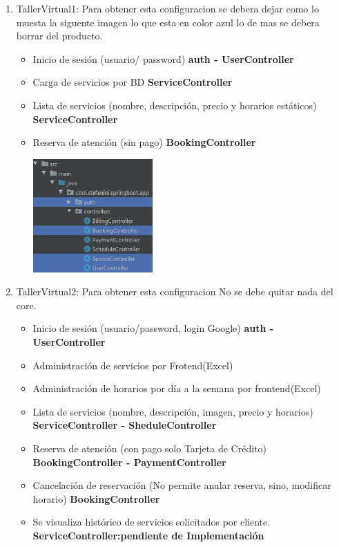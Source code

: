 \documentclass[10pt,a4paper,openany]{book}
\begin{document}
\begin{enumerate}
	\item TallerVirtual1: Para obtener esta configuracion se debera dejar como lo muesta la siguente imagen lo que esta en color azul lo de mas se debera borrar del producto.
	\begin{itemize}
		\item Inicio de sesión (usuario/ password) \textbf{auth - UserController}
		\item Carga de servicios por BD \textbf{ServiceController}
		\item Lista de servicios (nombre, descripción, precio y horarios estáticos) \textbf{ServiceController}
		\item Reserva de atención (sin pago) \textbf{BookingController}
		\begin{center}
		\includegraphics[width=0.38\textwidth]{div1}
		\end{center}
	\end{itemize}
	\item TallerVirtual2: Para obtener esta configuracion No se debe quitar nada del core.
	\begin{itemize}
		\item Inicio de sesión (usuario/password, login Google) \textbf{auth - UserController}
		\item Administración de servicios por Frotend(Excel)
		\item Administración de horarios por día a la semana por frontend(Excel)
		\item Lista de servicios (nombre, descripción, imagen, precio y horarios) \textbf{ServiceController - SheduleController}
		\item Reserva de atención (con pago solo Tarjeta de Crédito) \textbf{BookingController - PaymentController}
		\item Cancelación de reservación (No permite anular reserva, sino, modificar horario) \textbf{BookingController}
		\item Se visualiza histórico de servicios solicitados por cliente. \textbf{ServiceController:pendiente de Implementación} 

\end{itemize}
\end{enumerate}
\end{document}
